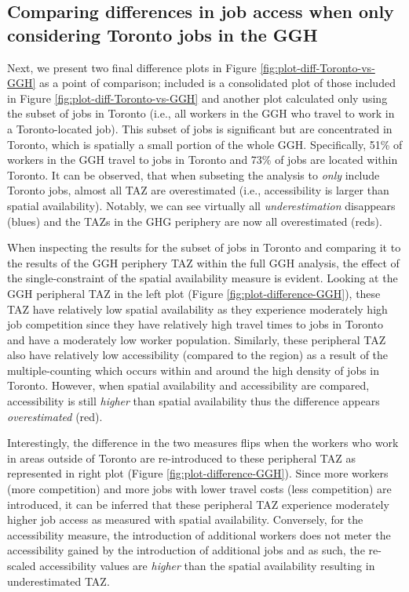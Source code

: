 \documentclass[]{elsarticle} %
\begin{document}
\hypertarget{comparing-differences-in-job-access-when-only-considering-toronto-jobs-in-the-ggh}{%
\subsection{Comparing differences in job access when only considering
Toronto jobs in the
GGH}\label{comparing-differences-in-job-access-when-only-considering-toronto-jobs-in-the-ggh}}

Next, we present two final difference plots in Figure
\ref{fig:plot-diff-Toronto-vs-GGH} as a point of comparison; included is
a consolidated plot of those included in Figure
\ref{fig:plot-diff-Toronto-vs-GGH} and another plot calculated only
using the subset of jobs in Toronto (i.e., all workers in the GGH who
travel to work in a Toronto-located job). This subset of jobs is
significant but are concentrated in Toronto, which is spatially a small
portion of the whole GGH. Specifically, 51\% of workers in the GGH
travel to jobs in Toronto and 73\% of jobs are located within Toronto.
It can be observed, that when subseting the analysis to \emph{only}
include Toronto jobs, almost all TAZ are overestimated (i.e.,
accessibility is larger than spatial availability). Notably, we can see
virtually all \emph{underestimation} disappears (blues) and the TAZs in
the GHG periphery are now all overestimated (reds).

When inspecting the results for the subset of jobs in Toronto and
comparing it to the results of the GGH periphery TAZ within the full GGH
analysis, the effect of the single-constraint of the spatial
availability measure is evident. Looking at the GGH peripheral TAZ in
the left plot (Figure \ref{fig:plot-difference-GGH}), these TAZ have
relatively low spatial availability as they experience moderately high
job competition since they have relatively high travel times to jobs in
Toronto and have a moderately low worker population. Similarly, these
peripheral TAZ also have relatively low accessibility (compared to the
region) as a result of the multiple-counting which occurs within and
around the high density of jobs in Toronto. However, when spatial
availability and accessibility are compared, accessibility is still
\emph{higher} than spatial availability thus the difference appears
\emph{overestimated} (red).

Interestingly, the difference in the two measures flips when the workers
who work in areas outside of Toronto are re-introduced to these
peripheral TAZ as represented in right plot (Figure
\ref{fig:plot-difference-GGH}). Since more workers (more competition)
and more jobs with lower travel costs (less competition) are introduced,
it can be inferred that these peripheral TAZ experience moderately
higher job access as measured with spatial availability. Conversely, for
the accessibility measure, the introduction of additional workers does
not meter the accessibility gained by the introduction of additional
jobs and as such, the re-scaled accessibility values are \emph{higher}
than the spatial availability resulting in underestimated TAZ.
\end{document}
